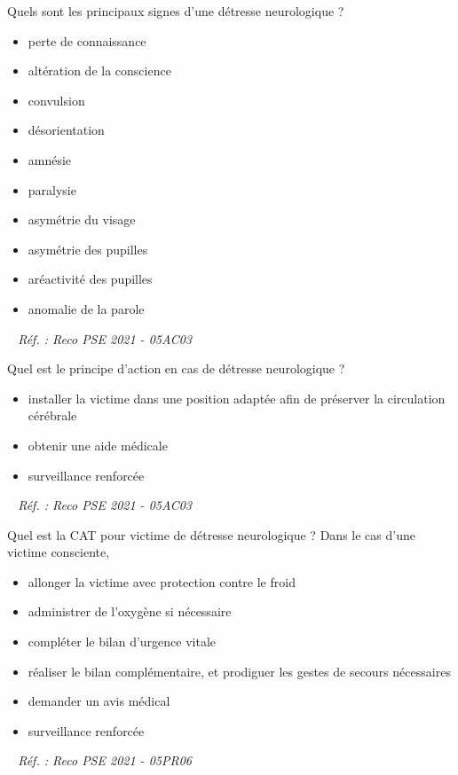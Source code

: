\documentclass[grid,avery5371,landscape]{flashcards}
\makeatletter
\newcounter{nocarte}
\newcommand{\categ}[1]{%
  \def\@categ{#1}%
  \setcounter{nocarte}{0}%
}
\newcommand{\source}[1]{%
  \medskip
  \itshape%
   ~ \hfill Réf. : #1}
\makeatother
\begin{document}
\color[HTML]{003273}
\categ{PSE}
\begin{flashcard}[bilan]{
 Quels sont les principaux signes d'une détresse neurologique ?   }
  \begin{itemize} \item perte de connaissance \item altération de la conscience \item convulsion \item désorientation \item amnésie \item paralysie \item asymétrie du visage \item asymétrie des pupilles \item aréactivité des pupilles \item anomalie de la parole \end{itemize}
  \source{Reco PSE 2021 - 05AC03}
\end{flashcard}


\color[HTML]{003273}
\categ{PSE}
\begin{flashcard}[CAT]{
 Quel est le principe d'action en cas de détresse neurologique ?   }
  \begin{itemize} \item installer la victime dans une position adaptée afin de préserver la circulation cérébrale \item obtenir une aide médicale \item surveillance renforcée \end{itemize}
  \source{Reco PSE 2021 - 05AC03}
\end{flashcard}


\color[HTML]{003273}
\categ{PSE}
\begin{flashcard}[CAT]{
 Quel est la CAT pour victime de détresse neurologique ?   }
  Dans le cas d'une victime consciente, \begin{itemize} \item allonger la victime avec protection contre le froid \item administrer de l'oxygène si nécessaire \item compléter le bilan d'urgence vitale \item réaliser le bilan complémentaire, et prodiguer les gestes de secours nécessaires \item demander un avis médical \item surveillance renforcée \end{itemize}
  \source{Reco PSE 2021 - 05PR06}
\end{flashcard}
\end{document}
